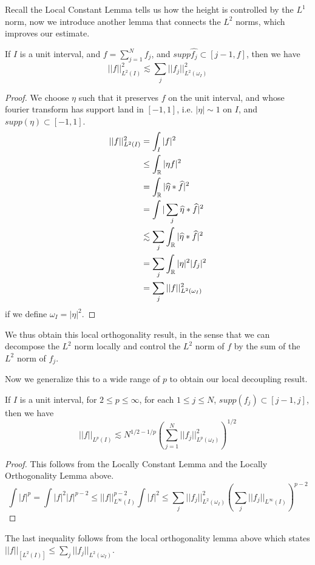 Recall the Local Constant Lemma tells us how the height is controlled by the $L^1$ norm, now we introduce another lemma that connects the $L^2$ norms, which improves our estimate.
\begin{lemma}
    If $I$ is a unit interval, and $f=\sum_{j=1}^Nf_j$, and $supp\widehat{f_j}\subset[j-1,f]$, then we have
    \begin{equation*}
        ||f||_{L^2(I)}^2\lesssim\sum_j||f_j||_{L^2(\omega_I)}^2
    \end{equation*}
\end{lemma}
\begin{proof}
    We choose $\eta$ such that it preserves $f$ on the unit interval, and whose fourier transform has support land in $[-1,1]$, i.e. $|\eta|\sim 1$ on $I$, and $supp(\eta)\subset[-1,1]$.
    \begin{align*}
        ||f||_{L^2(I)}^2&=\int_I|f|^2\\
        &\leq\int_{\mathbb{R}}|\eta f|^2\\
        &=\int_{\mathbb{R}}|\widehat{\eta}\ast\widehat{f}|^2\\
        &=\int|\sum_j\widehat{\eta}\ast\widehat{f}|^2\\
        &\lesssim\sum_j\int_{\mathbb{R}}|\widehat{\eta}\ast\widehat{f}|^2\\
        &=\sum_j\int_{\mathbb{R}}|\eta|^2|f_j|^2\\
        &=\sum_j||f||_{L^2(\omega_I)}^2
    \end{align*}
    if we define $\omega_I=|\eta|^2$.
\end{proof}

We thus obtain this local orthogonality result, in the sense that we can decompose the $L^2$ norm locally and control the $L^2$ norm of $f$ by the sum of the $L^2$ norm of $f_j$.

Now we generalize this to a wide range of $p$ to obtain our local decoupling result.

\begin{proposition}
    If $I$ is a unit interval, for $2\leq p\leq\infty$, for each $1\leq j\leq N$, $supp(f_j)\subset[j-1,j]$, then we have
    \begin{equation*}
        ||f||_{L^p(I)}\lesssim N^{1/2-1/p}\left(\sum_{j=1}^N||f_j||_{L^p(\omega_I)}^2 \right)^{1/2}
    \end{equation*}
\end{proposition}
\begin{proof}
    This follows from the Locally Constant Lemma and the Locally Orthogonality Lemma above. 
    \begin{equation*}
        \int|f|^p=\int|f|^2|f|^{p-2}\leq||f||_{L^\infty(I)}^{p-2}\int|f|^2\leq\sum_{j}||f_{j}||_{L^2(\omega_I)}^2\left(\sum_j||f_j||_{L^\infty(I)}\right)^{p-2}
    \end{equation*}
\end{proof}
The last inequality follows from the local orthogonality lemma above which states $||f||_[L^2(I)]\leq\sum_j||f_j||_{L^2(\omega_I)}$.

